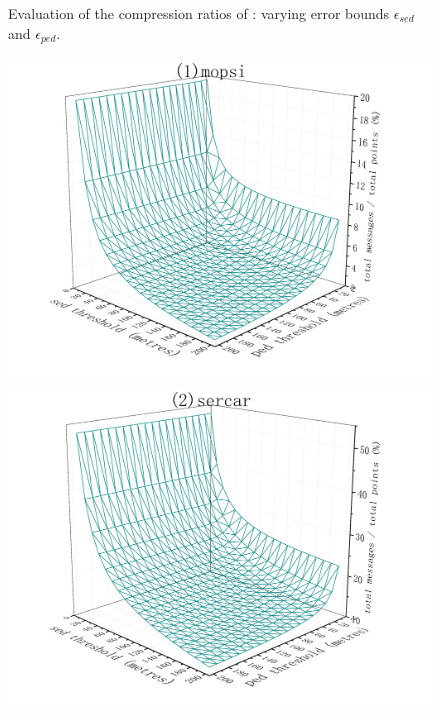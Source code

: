 \begin{figure}[tb!]
	\vspace{-2ex}
	\caption{\small Evaluation of the compression ratios of \bitt: varying error bounds $\epsilon_{sed}$ and $\epsilon_{ped}$.}
	\label{fig:bitt-compression-ratio}
	\vspace{-1ex}
\end{figure}


\begin{figure}[tb!]
	\centering
	\includegraphics[scale = 0.565]{figures/Fig-BITT-mopsi-total-messages.png}\hspace{1ex}
	\includegraphics[scale = 0.565]{figures/Fig-BITT-sercar-total-messages.png}\hspace{1ex}

\end{figure}
